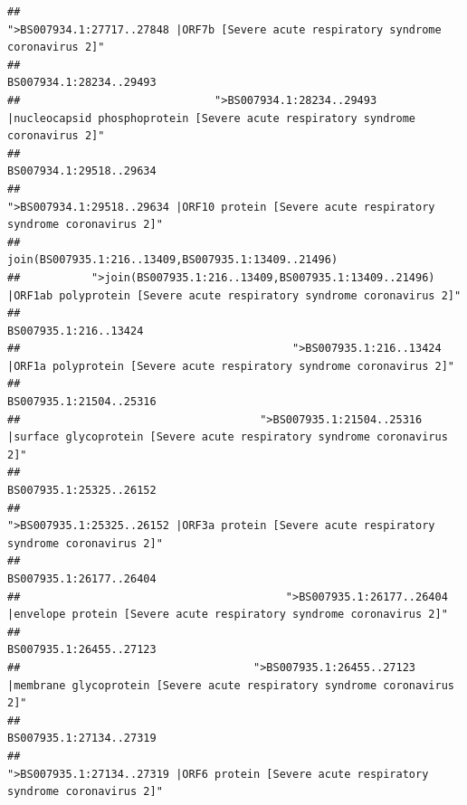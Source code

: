 \documentclass[
]{article}
\begin{document}
\begin{verbatim}
##                                                    ">BS007934.1:27717..27848 |ORF7b [Severe acute respiratory syndrome coronavirus 2]" 
##                                                                                                                BS007934.1:28234..29493 
##                              ">BS007934.1:28234..29493 |nucleocapsid phosphoprotein [Severe acute respiratory syndrome coronavirus 2]" 
##                                                                                                                BS007934.1:29518..29634 
##                                            ">BS007934.1:29518..29634 |ORF10 protein [Severe acute respiratory syndrome coronavirus 2]" 
##                                                                                    join(BS007935.1:216..13409,BS007935.1:13409..21496) 
##           ">join(BS007935.1:216..13409,BS007935.1:13409..21496) |ORF1ab polyprotein [Severe acute respiratory syndrome coronavirus 2]" 
##                                                                                                                  BS007935.1:216..13424 
##                                          ">BS007935.1:216..13424 |ORF1a polyprotein [Severe acute respiratory syndrome coronavirus 2]" 
##                                                                                                                BS007935.1:21504..25316 
##                                     ">BS007935.1:21504..25316 |surface glycoprotein [Severe acute respiratory syndrome coronavirus 2]" 
##                                                                                                                BS007935.1:25325..26152 
##                                            ">BS007935.1:25325..26152 |ORF3a protein [Severe acute respiratory syndrome coronavirus 2]" 
##                                                                                                                BS007935.1:26177..26404 
##                                         ">BS007935.1:26177..26404 |envelope protein [Severe acute respiratory syndrome coronavirus 2]" 
##                                                                                                                BS007935.1:26455..27123 
##                                    ">BS007935.1:26455..27123 |membrane glycoprotein [Severe acute respiratory syndrome coronavirus 2]" 
##                                                                                                                BS007935.1:27134..27319 
##                                             ">BS007935.1:27134..27319 |ORF6 protein [Severe acute respiratory syndrome coronavirus 2]" 

\end{verbatim}
\end{document}
